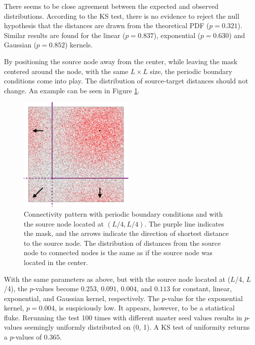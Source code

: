 There seems to be close agreement between the expected and observed distributions. According to the KS test, there is no evidence to reject the null hypothesis that the distances are drawn from the theoretical PDF ($p = 0.321$). Similar results are found for the linear ($p = 0.837$), exponential ($p = 0.630$) and Gaussian ($p = 0.852$) kernels. 

By positioning the source node away from the center, while leaving the mask centered around the node, with the same $L \times L$ size, the periodic boundary conditions come into play. The distribution of source-target distances should not change. An example can be seen in Figure \ref{fig:pbc}.
\begin{figure}[h]
  \centering
  \includegraphics[width=0.5\textwidth]{2D_gaussian_shifted_network.png}
  \caption[Connectivity pattern with periodic boundary conditions and a source node shifted away from the layer's center]{Connectivity pattern with periodic boundary conditions and with the source node located at $(L/4, L/4)$. The purple line indicates the mask, and the arrows indicate the direction of shortest distance to the source node. The distribution of distances from the source node to connected nodes is the same as if the source node was located in the center.}
  \label{fig:pbc}
\end{figure}
With the same parameters as above, but with the source node located at ($L$/4, $L$/4), the $p$-values become $0.253$, $0.091$, $0.004$, and $0.113$ for constant, linear, exponential, and Gaussian kernel, respectively. The $p$-value for the exponential kernel, $p = 0.004$, is suspiciously low. It appears, however, to be a statistical fluke. Rerunning the test 100 times with different master seed values results in $p$-values seemingly uniformly distributed on (0, 1). A KS test of uniformity returns a $p$-values of $0.365$. %

